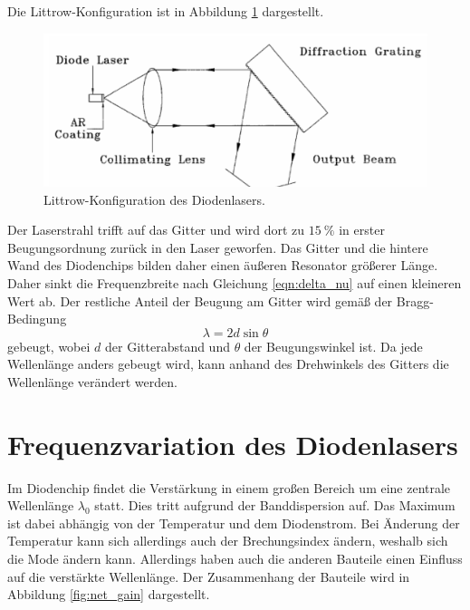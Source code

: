 Die Littrow-Konfiguration ist in Abbildung \ref{fig:littrow} dargestellt.
\begin{figure}
    \centering
    \includegraphics[scale=0.4]{bilder/aufbau_laser.png}
    \caption{Littrow-Konfiguration des Diodenlasers. \cite{diode_laser_spectroscopy}}
    \label{fig:littrow}
\end{figure}
Der Laserstrahl trifft auf das Gitter und wird dort zu $\qty{15}{\percent}$ in erster Beugungsordnung zurück in den Laser geworfen. Das Gitter und die hintere Wand des Diodenchips 
bilden daher einen äußeren Resonator größerer Länge. Daher sinkt die Frequenzbreite nach Gleichung \ref{eqn:delta_nu} auf einen kleineren Wert ab. Der restliche Anteil der Beugung am 
Gitter wird gemäß der Bragg-Bedingung 
\begin{equation}
    \label{eqn:Bragg}
    \lambda = 2d \sin\theta
\end{equation}
gebeugt, wobei $d$ der Gitterabstand und $\theta$ der Beugungswinkel ist. Da jede Wellenlänge anders gebeugt wird, kann anhand des Drehwinkels des Gitters die Wellenlänge verändert 
werden. 

\section{Frequenzvariation des Diodenlasers}
\label{sec:freq}

Im Diodenchip findet die Verstärkung in einem großen Bereich um eine zentrale Wellenlänge $\lambda_0$ statt. Dies tritt aufgrund der Banddispersion auf. Das Maximum ist dabei 
abhängig von der Temperatur und dem Diodenstrom. Bei Änderung der Temperatur kann sich allerdings auch der Brechungsindex ändern, weshalb sich die Mode ändern kann. Allerdings haben 
auch die anderen Bauteile einen Einfluss auf die verstärkte Wellenlänge. Der Zusammenhang der Bauteile wird in Abbildung \ref{fig:net_gain} dargestellt.

